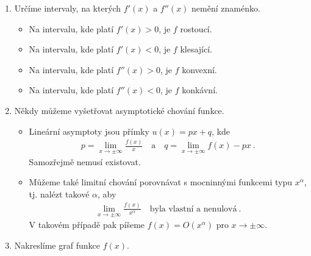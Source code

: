 \begin{enumerate}
    \item Určíme intervaly, na kterých $f'(x)$ a $f''(x)$ nemění znaménko.
    \begin{itemize}
        \item Na intervalu, kde platí $f'(x) > 0$, je $f$ rostoucí.
        \item Na intervalu, kde platí $f'(x) < 0$, je $f$ klesající.
        \item Na intervalu, kde platí $f''(x) > 0$, je $f$ konvexní.
        \item Na intervalu, kde platí $f''(x) < 0$, je $f$ konkávní.
    \end{itemize}

    \item Někdy můžeme vyšetřovat asymptotické chování funkce.
    \begin{itemize}
        \item Lineární asymptoty jsou přímky $u(x) = px+q$, kde 
        \begin{align*}
            p = \lim_{x \rightarrow \pm \infty} \frac{f(x)}{x} \quad \text{a} \quad q = \lim_{x \rightarrow \pm \infty} f(x) - px \:.
        \end{align*}
        Samozřejmě nemusí existovat.
        \item Můžeme také limitní chování porovnávat s mocninnými funkcemi typu $x^\alpha$, tj. nalézt takové $\alpha$, aby \begin{align*}
            \lim_{x \rightarrow \pm \infty} \frac{f(x)}{x^\alpha} \quad \text{byla vlastní a nenulová} \:.
        \end{align*}
        V takovém případě pak píšeme $f(x) = O(x^\alpha)$ pro $x \rightarrow \pm \infty$.
    \end{itemize}

    \item Nakreslíme graf funkce $f(x)$.
\end{enumerate}

